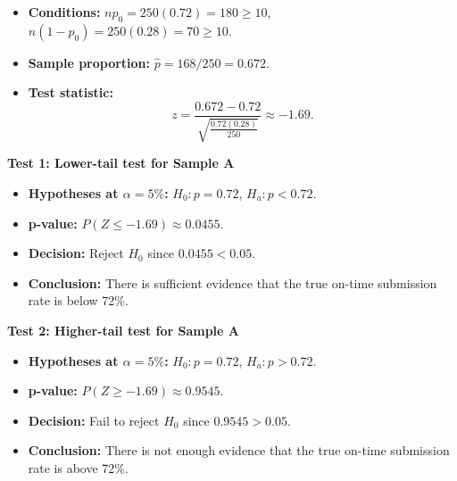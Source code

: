\begin{itemize}
	\item \textbf{Conditions:} \(np_0=250(0.72)=180\ge10\), \(n(1-p_0)=250(0.28)=70\ge10\).
	\item \textbf{Sample proportion:} \(\hat p=168/250=0.672\).
	\item \textbf{Test statistic:}
	\[
	z=\frac{0.672-0.72}{\sqrt{\frac{0.72(0.28)}{250}}}\approx -1.69.
	\]
\end{itemize}

\textbf{Test 1: Lower-tail test for Sample A}

\begin{itemize}
	\item \textbf{Hypotheses at \(\alpha=5\%\):} \(H_0\colon p=0.72\), \(H_a\colon p<0.72\).
	\item \textbf{p-value:} \(P(Z\le -1.69)\approx 0.0455\).
	\item \textbf{Decision:} Reject \(H_0\) since \(0.0455<0.05\).
	\item \textbf{Conclusion:} There is sufficient evidence that the true on-time submission rate is below 72\%.
\end{itemize}

\begin{center}
\end{center}


\textbf{Test 2: Higher-tail test for Sample A}

\begin{itemize}
	\item \textbf{Hypotheses at \(\alpha=5\%\):} \(H_0\colon p=0.72\), \(H_a\colon p>0.72\).
	\item \textbf{p-value:} \(P(Z\ge -1.69)\approx 0.9545\).
	\item \textbf{Decision:} Fail to reject \(H_0\) since \(0.9545>0.05\).
	\item \textbf{Conclusion:} There is not enough evidence that the true on-time submission rate is above 72\%.
\end{itemize}

\begin{center}
\end{center}


